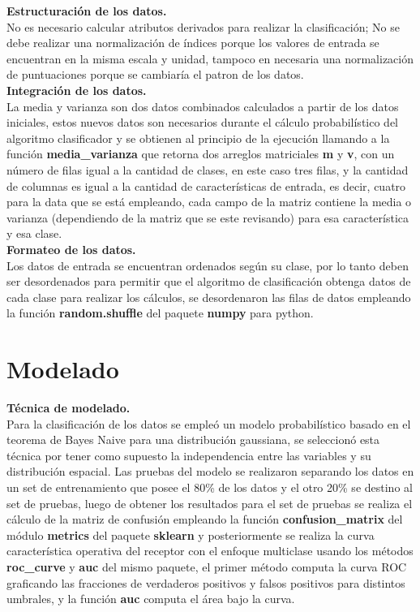 \noindent
\textbf{Estructuración de los datos.}\\

No es necesario calcular atributos derivados para realizar la clasificación; No se debe realizar
una normalización de índices porque los valores de entrada se encuentran en la misma escala y unidad,
tampoco en necesaria una normalización de puntuaciones porque se cambiaría el patron de los datos.\\

\noindent
\textbf{Integración de los datos.}\\

La media y varianza son dos datos combinados calculados a partir de los datos iniciales, estos nuevos
datos son necesarios durante el cálculo probabilístico del algoritmo clasificador y se
obtienen al principio de la ejecución llamando a la función \textbf{media\_varianza} que retorna
dos arreglos matriciales \textbf{m} y \textbf{v}, con un número de filas igual a la cantidad de clases, en este caso tres filas,
y la cantidad de columnas es igual a la cantidad de características de entrada, es decir, cuatro
para la data que se está empleando, cada campo de la matriz contiene la media o varianza (dependiendo de la
matriz que se este revisando) para esa característica y esa clase.\\

\noindent
\textbf{Formateo de los datos.}\\

Los datos de entrada se encuentran ordenados según su clase, por lo tanto deben ser desordenados
para permitir que el algoritmo de clasificación obtenga datos de cada clase para realizar los
cálculos, se desordenaron las filas de datos empleando la función \textbf{random.shuffle} del paquete
\textbf{numpy} para python.\\

\section{Modelado}

\noindent
\textbf{Técnica de modelado.}\\

Para la clasificación de los datos se empleó un modelo probabilístico basado en el teorema de Bayes Naive para una distribución
gaussiana, se seleccionó esta técnica por tener como supuesto la independencia entre las variables y su distribución
espacial. Las pruebas del modelo se realizaron separando los datos en un set de entrenamiento que posee el 80\% de los
datos y el otro 20\% se destino al set de pruebas, luego de obtener los resultados para el set de pruebas se realiza el
cálculo de la matriz de confusión empleando la función \textbf{confusion\_matrix} del módulo \textbf{metrics} del paquete \textbf{sklearn}
y posteriormente se realiza la curva característica operativa del receptor con el enfoque multiclase usando los métodos
\textbf{roc\_curve} y \textbf{auc} del mismo paquete, el primer método computa la curva ROC graficando las fracciones de
verdaderos positivos y falsos positivos para distintos umbrales, y la función \textbf{auc} computa el área bajo la curva.\\

